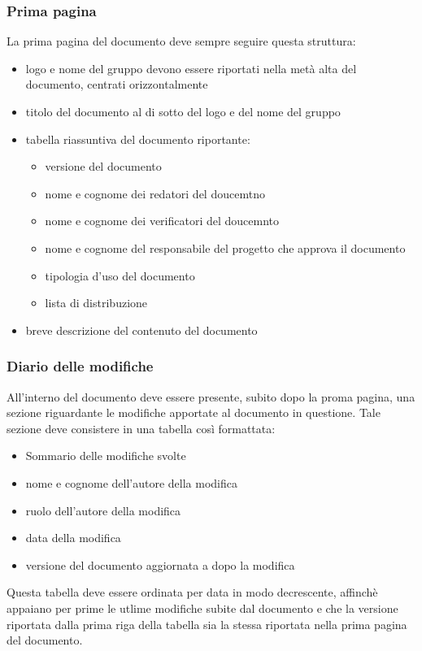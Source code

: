   \subsubsection{Prima pagina}
  La prima pagina del documento deve sempre seguire questa struttura:
  \begin{itemize}
    \item logo e nome del gruppo devono essere riportati nella metà alta del documento, centrati orizzontalmente
    \item titolo del documento al di sotto del logo e del nome del gruppo
    \item tabella riassuntiva del documento riportante:
      \begin{itemize}
      \item versione del documento
      \item nome e cognome dei redatori del doucemtno
      \item nome e cognome dei verificatori del doucemnto
      \item nome e cognome del responsabile del progetto che approva il documento
      \item tipologia d'uso del documento
      \item lista di distribuzione
      \end{itemize}
    \item breve descrizione del contenuto del documento
  \end{itemize}

  \subsubsection{Diario delle modifiche}
  All'interno del documento deve essere presente, subito dopo la proma pagina, una sezione riguardante le modifiche apportate al documento in questione. Tale sezione deve consistere in una tabella cos\`i formattata:
  \begin{itemize}
  \item Sommario delle modifiche svolte
  \item nome e cognome dell'autore della modifica
  \item ruolo dell'autore della modifica
  \item data della modifica
  \item versione del documento aggiornata a dopo la modifica
  \end{itemize}
  Questa tabella deve essere ordinata per data in modo decrescente, affinch\`e appaiano per prime le utlime modifiche subite dal documento e che la versione riportata dalla prima riga della tabella sia la stessa riportata nella prima pagina del documento.


